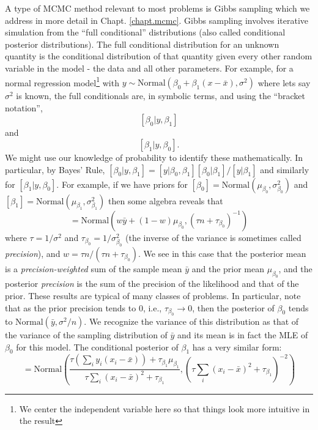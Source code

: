 A type of MCMC method relevant to most problems is Gibbs sampling 
\citep{geman_geman:1984} which we address in more detail in Chapt. \ref{chapt.mcmc}.
Gibbs sampling 
involves 
iterative simulation from the ``full
conditional'' 
distributions (also called conditional posterior
distributions). The full conditional distribution for an unknown
quantity is the conditional distribution of that quantity given every
other random variable in the model - the data and all other
parameters. 
For example, for a normal regression model\footnote{We center the 
independent variable here so that things look more intuitive in the result} with $y \sim
\mbox{Normal}(\beta_0 + \beta_1 (x-\bar{x}) , \sigma^{2})$
where lets say $\sigma^{2}$ is known, the full conditionals are, in
symbolic terms, and using the ``bracket notation'',
\[
[\beta_0|y,\beta_1]
\]
 and
\[
[\beta_1|y,\beta_0].
\]
We might use our knowledge of probability to identify these
mathematically. In particular, by Bayes' Rule, $[\beta_0|y,\beta_1] =
[y|\beta_0,\beta_1][\beta_0|\beta_1]/[y|\beta_1]$ and similarly for
$[\beta_1|y,\beta_0]$. For example, if we have priors for 
$[\beta_0] = \mbox{Normal}(\mu_{\beta_0}, \sigma^{2}_{\beta_0})$ 
and 
$[\beta_1] = \mbox{Normal}(\mu_{\beta_1}, \sigma^{2}_{\beta_1})$ then
some algebra reveals that 
\begin{equation}
[\beta_0|y,\beta_1] = \mbox{Normal}\left(w \bar{y} + (1-w)\mu_{\beta_0},
(\tau n + \tau_{\beta_0})^{-1} \right)
\label{glms.eq.alpha}
\end{equation}
where $\tau = 1/\sigma^{2}$ and $\tau_{\beta_0} = 1/\sigma^{2}_{\beta_0}$
(the inverse of the variance is sometimes called {\it precision}), and
$w = \tau n/(\tau n + \tau_{\beta_0})$. We see in this case that the
posterior mean is a {\it precision-weighted} sum of the sample mean
$\bar{y}$ and the prior mean $\mu_{\beta_0}$, and the posterior {\it precision} 
is the sum of the precision of the likelihood and that of the
prior. These results are typical of many
classes of problems. In particular, note that as the prior precision
tends to 0, i.e., $\tau_{\beta_0} \rightarrow 0$, then the posterior of
$\beta_0$ tends to  $\mbox{Normal}(\bar{y}, \sigma^{2}/n)$. We recognize the 
variance of this distribution as that of the variance of the sampling
distribution of $\bar{y}$ and its mean is in fact the MLE of $\beta_0$
for this model. 
The conditional posterior of $\beta_1$ has a very similar form:
\begin{equation}
 [\beta_1|y,\beta_0]  = \mbox{Normal}\left(
\frac{ \tau (\sum_{i} y_{i}(x_{i}-\bar{x}) ) + \tau_{\beta_1} \mu_{\beta_1}}
{ \tau \sum_{i} (x_{i}-\bar{x})^{2} + \tau_{\beta_1}},
(\tau \sum_{i} (x_{i}-\bar{x})^{2} + \tau_{\beta_1} )^{-2} \right)
\label{glms.eq.beta}
\end{equation}
